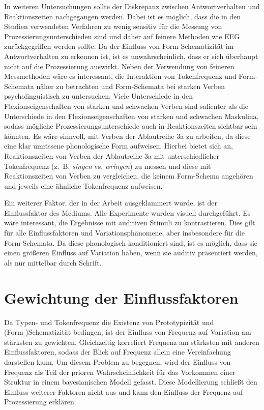 In weiteren Untersuchungen sollte der Diskrepanz zwischen Antwortverhalten und Reak\-tionszeiten nachgegangen werden. Dabei ist es möglich, dass die in den Studien verwendeten Verfahren zu wenig sensitiv für die Messung von Prozessierungsunterschieden sind und daher auf feinere Methoden wie EEG zurückgegriffen werden sollte. Da der Einfluss von Form-Schematizität im Antwortverhalten zu erkennen ist, ist es unwahrscheinlich, dass er sich überhaupt nicht auf die Prozessierung auswirkt. Neben der Verwendung von feineren Messmethoden wäre es in\-te\-res\-sant, die Interaktion von Tokenfrequenz und Form-Schemata näher zu betrachten und Form-Schemata bei starken Verben psycholinguistisch zu untersuchen. Viele Unterschiede in den Flexionseigenschaften von starken und schwachen Verben sind salienter als die Unterschiede in den Flexionseigenschaften von starken und schwachen Maskulina, sodass mögliche Prozessierungsunterschiede auch in Reaktionszeiten sichtbar sein könnten. Es wäre sinnvoll, mit Verben der Ablaut\-reihe 3a zu arbeiten, da diese eine klar umrissene phonologische Form aufweisen. Hierbei bietet sich an, Reaktionszeiten von Verben der Ablaut\-reihe 3a mit unterschiedlicher Tokenfrequenz (z.~B. \textit{singen} vs. \textit{wringen}) zu messen und diese mit Reaktionszeiten von Verben zu vergleichen, die keinem Form-Schema angehören und jeweils eine ähnliche Tokenfrequenz aufweisen. 


Ein weiterer Faktor, der in der Arbeit ausgeklammert wurde, ist der Einflussfaktor des Mediums. Alle Experimente wurden visuell durchgeführt. Es wäre interessant, die Ergebnisse mit auditiven Stimuli zu kontrastieren. Dies gilt für alle Einflussfaktoren und Variationsphänomene, aber insbesondere für die Form-Schemata. Da diese phonologisch konditioniert sind, ist es möglich, dass sie einen größeren Einfluss auf Variation haben, wenn sie auditiv präsentiert werden, als nur mittelbar durch Schrift.

\section{Gewichtung der Einflussfaktoren}

Da Typen- und Tokenfrequenz die Existenz von Prototypizität und \mbox{(Form-)}Sche\-ma\-ti\-zi\-tät bedingen, ist der Einfluss von Frequenz auf Variation am stärksten zu gewichten. Gleichzeitig korreliert Frequenz am stärksten mit anderen Einflussfaktoren, sodass der Blick auf Frequenz allein eine Vereinfachung darstellen kann. Um diesem Problem zu begegnen, wird der Einfluss von Frequenz als Teil der prioren Wahrscheinlichkeit für das Vorkommen einer Struktur in einem bayesianischen Modell gefasst. Diese Modellierung schließt den Einfluss weiterer Faktoren nicht aus und kann den Einfluss der Frequenz auf Prozessierung erklären.

